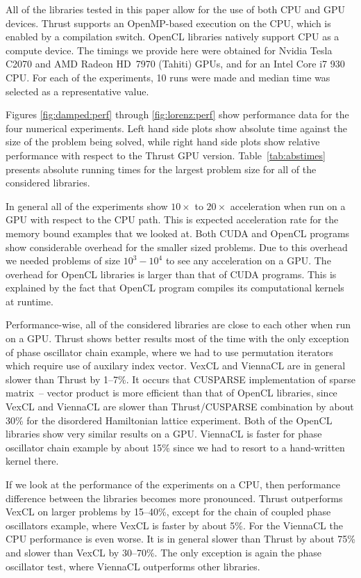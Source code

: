 \documentclass[final]{siamltex}
\begin{document}
All of the libraries tested in this paper allow for the use of both CPU and
GPU devices.  Thrust supports an OpenMP-based execution on the CPU, which is enabled
by a compilation switch. OpenCL libraries natively support CPU as a compute
device.  The timings we provide here were obtained for Nvidia Tesla C2070 and
AMD Radeon HD~7970 (Tahiti) GPUs, and for an Intel Core i7 930 CPU. For each of
the experiments, 10 runs were made and median time was selected as a
representative value.

Figures \ref{fig:damped:perf} through \ref{fig:lorenz:perf} show performance
data for the four numerical experiments. Left hand side plots show absolute
time against the size of the problem being solved, while right hand side plots
show relative performance with respect to the Thrust GPU version.
Table~\ref{tab:abstimes} presents absolute running times for the largest
problem size for all of the considered libraries.


In general all of the experiments show $10\times$ to $20\times$ acceleration
when run on a GPU with respect to the CPU path. This is expected acceleration
rate for the memory bound examples that we looked at. Both CUDA and OpenCL
programs show considerable overhead for the smaller sized problems.  Due to
this overhead we needed problems of size $10^3-10^4$ to see any acceleration on
a GPU. The overhead for OpenCL libraries is larger than that of CUDA programs.
This is explained by the fact that OpenCL program compiles its computational
kernels at runtime.

Performance-wise, all of the considered libraries are close to each other when
run on a GPU.  Thrust shows better results most of the time with the only
exception of phase oscillator chain example, where we had to use permutation
iterators which require use of auxilary index vector. VexCL and ViennaCL are in
general slower than Thrust by 1--7\%. It occurs that CUSPARSE implementation of
sparse matrix~-- vector product is more efficient than that of OpenCL
libraries, since VexCL and ViennaCL are slower than Thrust/CUSPARSE combination
by about 30\% for the disordered Hamiltonian lattice experiment. Both of the
OpenCL libraries show very similar results on a GPU.  ViennaCL is faster for
phase oscillator chain example by about 15\% since we had to resort to a
hand-written kernel there.

If we look at the performance of the experiments on a CPU, then performance
difference between the libraries becomes more pronounced. Thrust outperforms
VexCL on larger problems by 15--40\%, except for the chain of coupled phase
oscillators example, where VexCL is faster by about 5\%. For the ViennaCL the
CPU performance is even worse. It is in general slower than Thrust by about
75\%  and slower than VexCL by 30--70\%. The only exception is again the phase
oscillator test, where ViennaCL outperforms other libraries.
\end{document}
